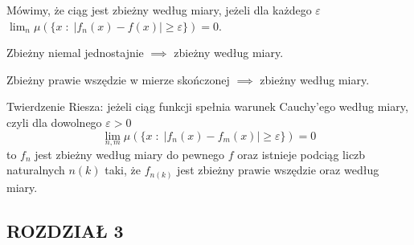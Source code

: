 \documentclass{article}[13pt]
\begin{document}
\begin{multicols}{2}
    Mówimy, że ciąg jest {\color{def}zbieżny według miary}, jeżeli dla każdego $\varepsilon$ $\lim_n\mu(\{x\;:\;|f_n(x)-f(x)|\geq\varepsilon\})=0$.
    \medskip

    {\color{acc}\point} Zbieżny niemal jednostajnie $\implies$ zbieżny według miary.

    {\color{acc}\point} Zbieżny prawie wszędzie w mierze skończonej $\implies$ zbieżny według miary.
    \medskip

    {\color{def}Twierdzenie Riesza}: jeżeli ciąg funkcji spełnia {\color{acc}warunek Cauchy'ego według miary}, czyli dla dowolnego $\varepsilon>0$
    $$\lim_{n,m}\mu(\{x\;:\;|f_n(x)-f_m(x)|\geq\varepsilon\})=0$$
    to $f_n$ jest zbieżny według miary do pewnego $f$ oraz istnieje podciąg liczb naturalnych $n(k)$ taki, że $f_{n(k)}$ jest zbieżny prawie wszędzie oraz według miary.
\end{multicols}
\bigskip

\bigskip

\subsection*{ROZDZIAŁ 3}
\end{document}
